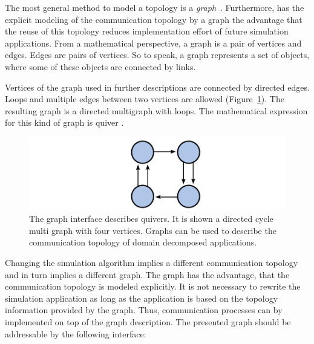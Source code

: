 

The most general method to model a topology is a
\emph{graph}~\cite{ref:graph}. Furthermore, has the explicit modeling
of the communication topology by a graph the advantage that the reuse
of this topology reduces implementation effort of future simulation
applications.  From a mathematical perspective, a graph is a pair of
vertices and edges. Edges are pairs of vertices. So to speak, a graph
represents a set of objects, where some of these objects are connected
by links.

Vertices of the graph used in further descriptions are connected by
directed edges.  Loops and multiple edges between two vertices are
allowed (Figure~\ref{fig:graph}). The resulting graph is a directed
multigraph with loops. The mathematical expression for this kind of
graph is quiver \cite{ref:quiver}.

\begin{figure}[H]
  \centering \includegraphics[width=\textwidth]{graphics/30_graph}
  \caption{The graph interface describes quivers. It is shown a
    directed cycle multi graph with four vertices. Graphs can be
    used to describe the communication topology of domain decomposed
    applications.}
  \label{fig:graph}
\end{figure}

\noindent Changing the simulation algorithm implies a different
communication topology and in turn implies a different graph. The
graph has the advantage, that the communication topology is
modeled explicitly. It is not necessary to rewrite the simulation
application as long as the application is based on the topology
information provided by the graph. Thus, communication processes can
by implemented on top of the graph description. The presented graph
should be addressable by the following interface:

